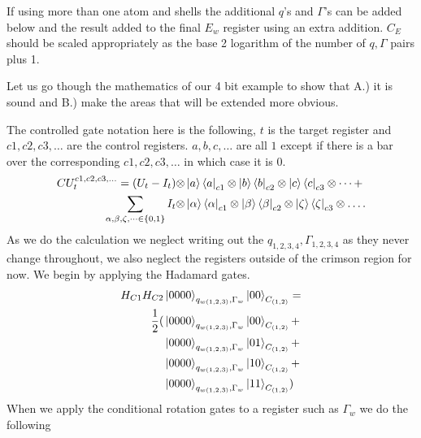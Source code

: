 If using more than one atom and shells the additional $q$'s and $\Gamma$'s can be added below and the result added to the final $E_w$ register using an extra addition. $C_E$ should be scaled appropriately as the base 2 logarithm of the number of $q,\Gamma$ pairs plus 1.   

Let us go though the mathematics of our 4 bit example to show that A.) it is sound and B.) make the areas that will be extended more obvious. 

The controlled gate notation here is the following, $t$ is the target register and $c1,c2,c3,\dots$ are the control registers. $a,b,c,\dots$ are all $1$ except if there is a bar over the corresponding $c1,c2,c3,\dots$ in which case it is $0$. 
\begin{equation}
    \begin{split}
        CU^{c1,c2,c3,\dots}_t = (U_t-I_t)\otimes &\ket{a}\bra{a}_{c1} \otimes \ket{b}\bra{b}_{c2} \otimes \ket{c}\bra{c}_{c3}\otimes\dots+\\ 
        \sum_{\alpha,\beta,\zeta,\dots\in\{0,1\}}I_t\otimes &\ket{\alpha}\bra{\alpha}_{c1} \otimes \ket{\beta}\bra{\beta}_{c2} \otimes \ket{\zeta}\bra{\zeta}_{c3}\otimes\dots. 
    \end{split}
\end{equation}
As we do the calculation we neglect writing out the $q_{1,2,3,4},\Gamma_{1,2,3,4}$ as they never change throughout, we also neglect the registers outside of the crimson region for now. 
We begin by applying the Hadamard gates.
\begin{equation}
    \begin{split}
        H_{C1}H_{C2}&\ket{0000}_{q_{w(1,2,3)},\Gamma_w}\ket{ 00}_{C_{(1,2)}}=\\
        \frac{1}{2}(
        &\ket{0000}_{q_{w(1,2,3)},\Gamma_w}\ket{ 00}_{C_{(1,2)}}+\\
        &\ket{0000}_{q_{w(1,2,3)},\Gamma_w}\ket{ 01}_{C_{(1,2)}}+\\
        &\ket{0000}_{q_{w(1,2,3)},\Gamma_w}\ket{ 10}_{C_{(1,2)}}+\\
        &\ket{0000}_{q_{w(1,2,3)},\Gamma_w}\ket{ 11}_{C_{(1,2)}}
        )
    \end{split}
\end{equation}
When we apply the conditional rotation gates to a register such as $\Gamma_w$ we do the following
